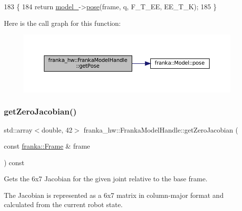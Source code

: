 \begin{DoxyCode}
183             \{
184     \textcolor{keywordflow}{return} \hyperlink{classfranka__hw_1_1FrankaModelHandle_a0c47e6c735f1bd809581b0498d53349b}{model\_}->\hyperlink{classfranka_1_1Model_adcd68a474d3843e5d9699c0f37fc76e8}{pose}(frame, q, F\_T\_EE, EE\_T\_K);
185   \}
\end{DoxyCode}
Here is the call graph for this function\+:
\nopagebreak
\begin{figure}[H]
\begin{center}
\leavevmode
\includegraphics[width=350pt]{classfranka__hw_1_1FrankaModelHandle_aa5f4161223cf728ad3ca1bf48768df50_cgraph}
\end{center}
\end{figure}
\mbox{\label{classfranka__hw_1_1FrankaModelHandle_a09d1582af0e1a0e8dd156f612c06b7f6}} 
\subsubsection{\texorpdfstring{get\+Zero\+Jacobian()}{getZeroJacobian()}\hspace{0.1cm}{\footnotesize\ttfamily [1/2]}}
{\footnotesize\ttfamily std\+::array$<$double, 42$>$ franka\+\_\+hw\+::\+Franka\+Model\+Handle\+::get\+Zero\+Jacobian (\begin{DoxyParamCaption}\item[{const \hyperlink{namespacefranka_a00b729ddce916481d3f0d10febec4f5b}{franka\+::\+Frame} \&}]{frame }\end{DoxyParamCaption}) const\hspace{0.3cm}{\ttfamily [inline]}}

Gets the 6x7 Jacobian for the given joint relative to the base frame.

The Jacobian is represented as a 6x7 matrix in column-\/major format and calculated from the current robot state.


